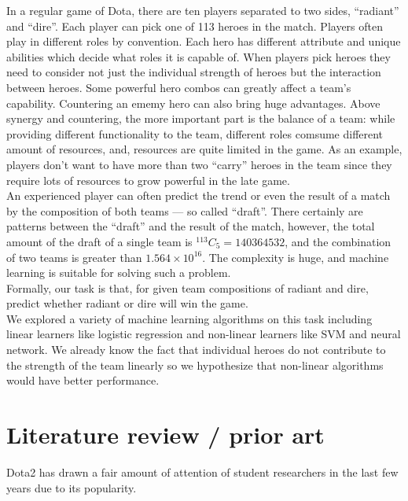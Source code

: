 \documentclass[12pt,openany,a4paper]{book}
\newcommand*{\Comb}[2]{{}^{#1}C_{#2}}%
\begin{document}
In a regular game of Dota, there are ten players separated to two sides, ``radiant'' and ``dire''. Each player can pick one of 113 heroes in the match. Players often play in different roles by convention. Each hero has different attribute and unique abilities which decide what roles it is capable of. When players pick heroes they need to consider not just the individual strength of heroes but the interaction between heroes. Some powerful hero combos can greatly affect a team's capability. Countering an ememy hero can also bring huge advantages. Above synergy and countering, the more important part is the balance of a team: while providing different functionality to the team, different roles comsume different amount of resources, and, resources are quite limited in the game. As an example, players don't want to have more than two ``carry'' heroes in the team since they require lots of resources to grow powerful in the late game.\\

An experienced player can often predict the trend or even the result of a match by the composition of both teams --- so called ``draft''. There certainly are patterns between the ``draft'' and the result of the match, however, the total amount of the draft of a single team is $\Comb{113}{5}=140364532 $, and the combination of two teams is greater than $1.564\times10^{16}$. The complexity is huge, and machine learning is suitable for solving such a problem.\\

Formally, our task is that, for given team compositions of radiant and dire, predict whether radiant or dire will win the game.\\

We explored a variety of machine learning algorithms on this task including linear learners like logistic regression and non-linear learners like SVM and neural network. We already know the fact that individual heroes do not contribute to the strength of the team linearly so we hypothesize that non-linear algorithms would have better performance.

\chapter{Literature review / prior art}

Dota2 has drawn a fair amount of attention of student researchers in the last few years due to its popularity. \\
	
\end{document}
